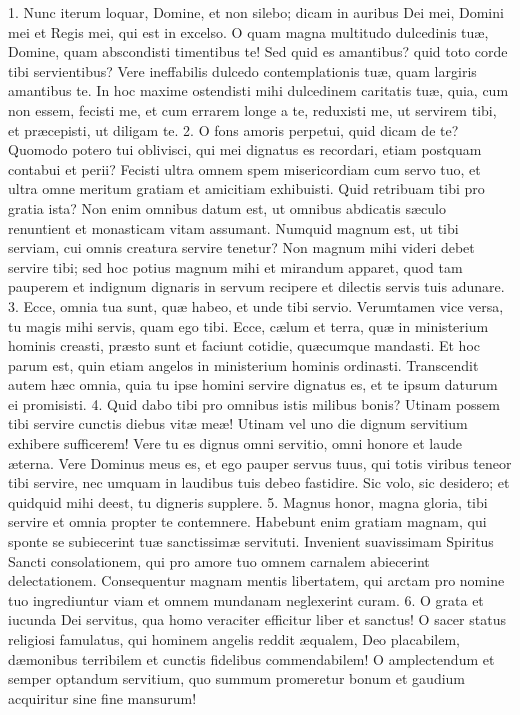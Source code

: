 1. Nunc iterum loquar, Domine, et non silebo; dicam in auribus Dei mei, Domini mei et Regis mei, qui est in excelso. O quam magna multitudo dulcedinis tuæ, Domine, quam abscondisti timentibus te! Sed quid es amantibus? quid toto corde tibi servientibus? Vere ineffabilis dulcedo contemplationis tuæ, quam largiris amantibus te. In hoc maxime ostendisti mihi dulcedinem caritatis tuæ, quia, cum non essem, fecisti me, et cum errarem longe a te, reduxisti me, ut servirem tibi, et præcepisti, ut diligam te.
2. O fons amoris perpetui, quid dicam de te? Quomodo potero tui oblivisci, qui mei dignatus es recordari, etiam postquam contabui et perii? Fecisti ultra omnem spem misericordiam cum servo tuo, et ultra omne meritum gratiam et amicitiam exhibuisti. Quid retribuam tibi pro gratia ista? Non enim omnibus datum est, ut omnibus abdicatis sæculo renuntient et monasticam vitam assumant. Numquid magnum est, ut tibi serviam, cui omnis creatura servire tenetur? Non magnum mihi videri debet servire tibi; sed hoc potius magnum mihi et mirandum apparet, quod tam pauperem et indignum dignaris in servum recipere et dilectis servis tuis adunare.
3. Ecce, omnia tua sunt, quæ habeo, et unde tibi servio. Verumtamen vice versa, tu magis mihi servis, quam ego tibi. Ecce, cælum et terra, quæ in ministerium hominis creasti, præsto sunt et faciunt cotidie, quæcumque mandasti. Et hoc parum est, quin etiam angelos in ministerium hominis ordinasti. Transcendit autem hæc omnia, quia tu ipse homini servire dignatus es, et te ipsum daturum ei promisisti.
4. Quid dabo tibi pro omnibus istis milibus bonis? Utinam possem tibi servire cunctis diebus vitæ meæ! Utinam vel uno die dignum servitium exhibere sufficerem! Vere tu es dignus omni servitio, omni honore et laude æterna. Vere Dominus meus es, et ego pauper servus tuus, qui totis viribus teneor tibi servire, nec umquam in laudibus tuis debeo fastidire. Sic volo, sic desidero; et quidquid mihi deest, tu digneris supplere.
5. Magnus honor, magna gloria, tibi servire et omnia propter te contemnere. Habebunt enim gratiam magnam, qui sponte se subiecerint tuæ sanctissimæ servituti. Invenient suavissimam Spiritus Sancti consolationem, qui pro amore tuo omnem carnalem abiecerint delectationem. Consequentur magnam mentis libertatem, qui arctam pro nomine tuo ingrediuntur viam et omnem mundanam neglexerint curam.
6. O grata et iucunda Dei servitus, qua homo veraciter efficitur liber et sanctus! O sacer status religiosi famulatus, qui hominem angelis reddit æqualem, Deo placabilem, dæmonibus terribilem et cunctis fidelibus commendabilem! O amplectendum et semper optandum servitium, quo summum promeretur bonum et gaudium acquiritur sine fine mansurum!



